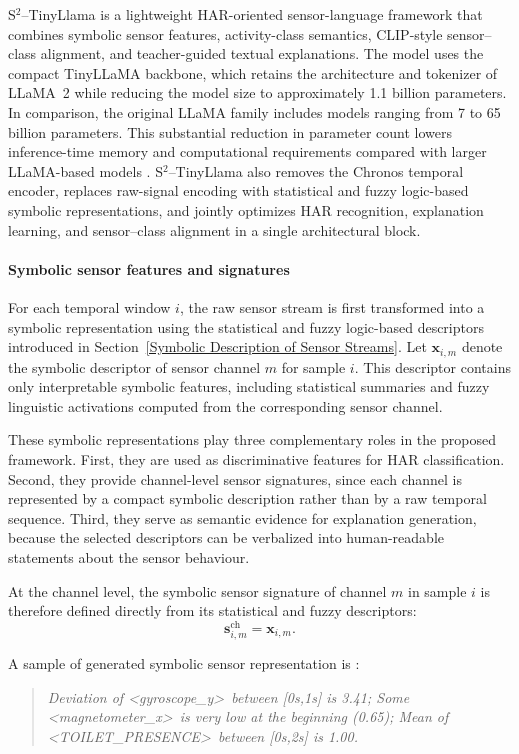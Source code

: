 \documentclass[preprint,12pt]{elsarticle}
\begin{document}
S$^2$--TinyLlama is a lightweight HAR-oriented sensor-language framework that combines symbolic sensor features, activity-class semantics, CLIP-style sensor--class alignment, and teacher-guided textual explanations. The model uses the compact TinyLLaMA backbone, which retains the architecture and tokenizer of LLaMA~2 while reducing the model size to approximately 1.1 billion parameters. In comparison, the original LLaMA family includes models ranging from 7 to 65 billion parameters. This substantial reduction in parameter count lowers inference-time memory and computational requirements compared with larger LLaMA-based models \cite{zhang2024tinyllama}.  S$^2$--TinyLlama also removes the Chronos temporal encoder, replaces raw-signal encoding with statistical and fuzzy logic-based symbolic representations, and jointly optimizes HAR recognition, explanation learning, and sensor--class alignment in a single architectural block.


\paragraph{Symbolic sensor features and signatures}
For each temporal window $i$, the raw sensor stream is first transformed into a symbolic representation using the statistical and fuzzy logic-based descriptors introduced in Section~\ref{Symbolic Description of Sensor Streams}. Let $\mathbf{x}_{i,m}$ denote the symbolic descriptor of sensor channel $m$ for sample $i$. This descriptor contains only interpretable symbolic features, including statistical summaries and fuzzy linguistic activations computed from the corresponding sensor channel.

These symbolic representations play three complementary roles in the proposed framework. First, they are used as discriminative features for HAR classification. Second, they provide channel-level sensor signatures, since each channel is represented by a compact symbolic description rather than by a raw temporal sequence. Third, they serve as semantic evidence for explanation generation, because the selected descriptors can be verbalized into human-readable statements about the sensor behaviour.

At the channel level, the symbolic sensor signature of channel $m$ in sample $i$ is therefore defined directly from its statistical and fuzzy descriptors:
\[
\mathbf{s}_{i,m}^{\mathrm{ch}} = \mathbf{x}_{i,m}.
\]

A sample of generated symbolic sensor representation is :
\begin{quote}

\textit{Deviation of \textless gyroscope\_y\textgreater\ between [0s,1s] is 3.41;
Some  \textless magnetometer\_x\textgreater\ is very low at the beginning (0.65); Mean of \textless TOILET\_PRESENCE\textgreater\ between [0s,2s] is 1.00.}
\end{quote}
\end{document}
